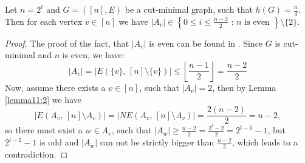 \begin{prop}
Let \(n=2^t\) and \(G=([n],E)\) be a cut-minimal graph, such that \(h(G)=\frac{n}{3}\). Then for each vertex \(v\in [n]\) we have \(|A_v|\in\left\{0\leq i\leq\frac{n-2}{2}\text{ : }n\text{ is even }\right\}\setminus\{2\}\).
\begin{proof}
The proof of the fact, that \(|A_v|\) is even can be found in \cite{1}. Since \(G\) is cut-minimal and \(n\) is even, we have:
\[
|A_v|=|E(\{v\}\text{, }[n]\setminus\{v\})|\leq\left\lfloor\frac{n-1}{2}\right\rfloor=\frac{n-2}{2}
\]
Now, assume there exists a \(v\in [n]\), such that \(|A_v|=2\), then by Lemma \ref{lemma11:2} we have
\[
|E(A_v\text{, }[n]\setminus A_v)|=|NE(A_v\text{, }[n]\setminus A_v)|=\frac{2(n-2)}{2}=n-2,
\]
so there must exist a \(w\in A_v\), such that \(|A_w|\geq\frac{n-2}{2}=\frac{2^t-2}{2}=2^{t-1}-1\), but \(2^{t-1}-1\) is odd and \(|A_w|\) can not be strictly bigger than \(\frac{n-2}{2}\), which leads to a contradiction.
\end{proof}
\end{prop}
